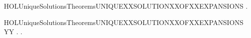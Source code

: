 \begin{SaveVerbatim}{HOLUniqueSolutionsTheoremsUNIQUEXXSOLUTIONXXOFXXEXPANSIONS}
\HOLTokenTurnstile{} \HOLSymConst{\HOLTokenForall{}}  .
         \HOLSymConst{\HOLTokenConj{}}     \HOLSymConst{\HOLTokenConj{}}     \HOLSymConst{\HOLTokenImp{}}   
\end{SaveVerbatim}
\newcommand{\HOLUniqueSolutionsTheoremsUNIQUEXXSOLUTIONXXOFXXEXPANSIONS}{\UseVerbatim{HOLUniqueSolutionsTheoremsUNIQUEXXSOLUTIONXXOFXXEXPANSIONS}}
\begin{SaveVerbatim}{HOLUniqueSolutionsTheoremsUNIQUEXXSOLUTIONXXOFXXEXPANSIONSYY}
\HOLTokenTurnstile{} \HOLSymConst{\HOLTokenForall{}}.
         \HOLSymConst{\HOLTokenImp{}}
       \HOLSymConst{\HOLTokenForall{}} .     \HOLSymConst{\HOLTokenConj{}}     \HOLSymConst{\HOLTokenImp{}}   
\end{SaveVerbatim}
\newcommand{\HOLUniqueSolutionsTheoremsUNIQUEXXSOLUTIONXXOFXXEXPANSIONSYY}{\UseVerbatim{HOLUniqueSolutionsTheoremsUNIQUEXXSOLUTIONXXOFXXEXPANSIONSYY}}
